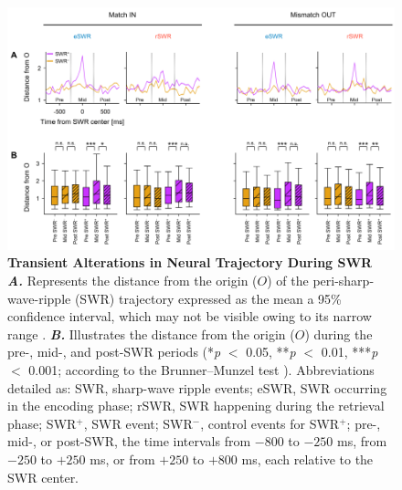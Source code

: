 \documentclass[final,3p,times,twocolumn]{elsarticle}
\begin{document}
        \clearpage
        \begin{figure}[ht]
        	\centering
            \includegraphics[width=1\textwidth]{./src/figures/.png/Figure_ID_05.png}
        	\caption{\textbf{
Transient Alterations in Neural Trajectory During SWR
}
\smallskip
\\
\textbf{\textit{A.}} Represents the distance from the origin ($O$) of the peri-sharp-wave-ripple (SWR) trajectory expressed as the mean \textpm a 95\% confidence interval, which may not be visible owing to its narrow range \cite{girardeau_selective_2009,norman_hippocampal_2019,buzsaki_hippocampal_2015}. \textbf{\textit{B.}} Illustrates the distance from the origin ($O$) during the pre-, mid-, and post-SWR periods (*\textit{p} $<$ 0.05, **\textit{p} $<$ 0.01, ***\textit{p} $<$ 0.001; according to the Brunner--Munzel test \cite{boran_persistent_2019}). Abbreviations detailed as: SWR, sharp-wave ripple events; eSWR, SWR occurring in the encoding phase; rSWR, SWR happening during the retrieval phase; SWR$^+$, SWR event; SWR$^-$, control events for SWR$^+$; pre-, mid-, or post-SWR, the time intervals from $-800$ to $-250$ ms, from $-250$ to $+250$ ms, or from $+250$ to $+800$ ms, each relative to the SWR center.
}
        	\label{fig:05}
        \end{figure}
        \clearpage
\end{document}
